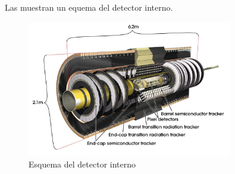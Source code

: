 
Las  muestran un equema del detector interno.

\begin{figure}
\centering
  \includegraphics[width=0.8\textwidth]{images/pixel_2.jpg}
  \caption{Esquema del detector interno}
  \label{pixel_1}
\end{figure}

